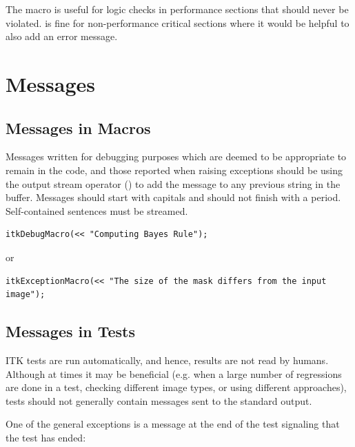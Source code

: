 The  macro is useful for logic
checks in performance sections that should never be violated.
 is fine for non-performance critical sections where
it would be helpful to also add an error message.


\section{Messages}%
\label{sec:Messages}


\subsection{Messages in Macros}%
\label{sec:MessagesInMacros}

Messages written for debugging purposes which are deemed to be appropriate to
remain in the code, and those reported when raising exceptions should be using
the output stream operator (\code{<<}) to add the message to any previous string
in the buffer. Messages should start with capitals and should not finish with a
period. Self-contained sentences must be streamed.

\small
\begin{verbatim}
itkDebugMacro(<< "Computing Bayes Rule");
\end{verbatim}
\normalsize

or

\small
\begin{verbatim}
itkExceptionMacro(<< "The size of the mask differs from the input image");
\end{verbatim}
\normalsize


\subsection{Messages in Tests}%
\label{subsec:MessagesInTests}

ITK tests are run automatically, and hence, results are not read by humans.
Although at times it may be beneficial (e.g. when a large number of regressions
are done in a test, checking different image types, or using different
approaches), tests should not generally contain messages sent to the standard
output.

One of the general exceptions is a message at the end of the test signaling
that the test has ended:

